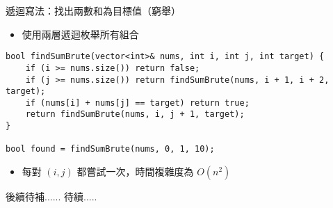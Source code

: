 \documentclass{beamer}
\begin{document}
\begin{frame}[fragile]{遞迴寫法：找出兩數和為目標值（窮舉）}
\begin{itemize}
    \item 使用兩層遞迴枚舉所有組合
\end{itemize}

\vspace{0.5em}
\begin{lstlisting}[style=cppstyle]
bool findSumBrute(vector<int>& nums, int i, int j, int target) {
    if (i >= nums.size()) return false;
    if (j >= nums.size()) return findSumBrute(nums, i + 1, i + 2, target);
    if (nums[i] + nums[j] == target) return true;
    return findSumBrute(nums, i, j + 1, target);
}

bool found = findSumBrute(nums, 0, 1, 10);
\end{lstlisting}

\vspace{0.5em}
\begin{itemize}
    \item 每對 $(i, j)$ 都嘗試一次，時間複雜度為 $O(n^2)$
\end{itemize}
\end{frame}

\begin{frame}[fragile]{後續待補......}
待續.....
\end{frame}
\end{document}
